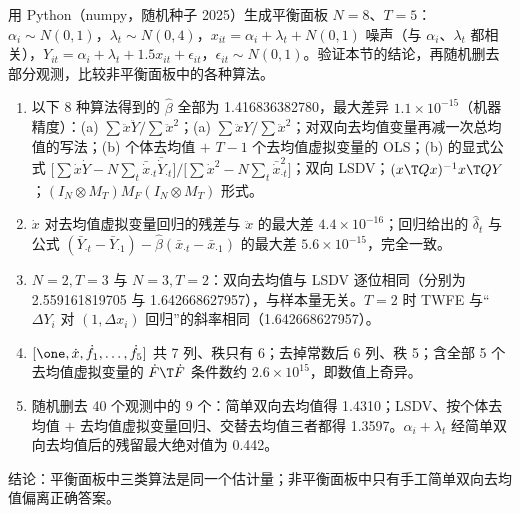 \begin{exmp}[数值验证：(a)$=$(b)$=$LSDV，非平衡时 (a) 失效]
用 Python（numpy，随机种子 2025）生成平衡面板 $N=8$、$T=5$：$\alpha_i\sim N(0,1)$，$\lambda_t\sim N(0,4)$，$x_{it}=\alpha_i+\lambda_t+N(0,1)$ 噪声（与 $\alpha_i$、$\lambda_t$ 都相关），$Y_{it}=\alpha_i+\lambda_t+1.5x_{it}+\epsilon_{it}$，$\epsilon_{it}\sim N(0,1)$。验证本节的结论，再随机删去部分观测，比较非平衡面板中的各种算法。
\solution
\begin{enumerate}
  \item {}以下 8 种算法得到的 $\hat\beta$ 全部为 1.416836382780，最大差异 $1.1\times10^{-15}$（机器精度）：(a) $\sum\ddot x\ddot Y/\sum\ddot x^2$；(a) $\sum\ddot xY/\sum\ddot x^2$；对双向去均值变量再减一次总均值的写法；(b) 个体去均值 $+$ $T-1$ 个去均值虚拟变量的 OLS；(b) 的显式公式 $\big[\sum\dot x\dot Y-N\sum_t\bar{\dot x}_{\cdot t}\bar{\dot Y}_{\cdot t}\big]/\big[\sum\dot x^2-N\sum_t\bar{\dot x}_{\cdot t}^2\big]$；双向 LSDV；$(x\T Qx)^{-1}x\T QY$；$(I_N\otimes M_T)M_F(I_N\otimes M_T)$ 形式。
  \item {}$\dot x$ 对去均值虚拟变量回归的残差与 $\ddot x$ 的最大差 $4.4\times10^{-16}$；回归给出的 $\hat\delta_t$ 与公式 $(\bar Y_{\cdot t}-\bar Y_{\cdot1})-\hat\beta(\bar x_{\cdot t}-\bar x_{\cdot1})$ 的最大差 $5.6\times10^{-15}$，完全一致。
  \item {}$N=2,T=3$ 与 $N=3,T=2$：双向去均值与 LSDV 逐位相同（分别为 2.559161819705 与 1.642668627957），与样本量无关。$T=2$ 时 TWFE 与“$\Delta Y_i$ 对 $(1,\Delta x_i)$ 回归”的斜率相同（1.642668627957）。
  \item {}$[\one,\dot x,\dot f_1,\dots,\dot f_5]$ 共 7 列、秩只有 6；去掉常数后 6 列、秩 5；含全部 5 个去均值虚拟变量的 $\dot F\T\dot F$ 条件数约 $2.6\times10^{15}$，即数值上奇异。
  \item {}随机删去 40 个观测中的 9 个：简单双向去均值得 1.4310；LSDV、按个体去均值 $+$ 去均值虚拟变量回归、交替去均值三者都得 1.3597。$\alpha_i+\lambda_t$ 经简单双向去均值后的残留最大绝对值为 0.442。
\end{enumerate}
结论：平衡面板中三类算法是同一个估计量；非平衡面板中只有手工简单双向去均值偏离正确答案。
\end{exmp}

